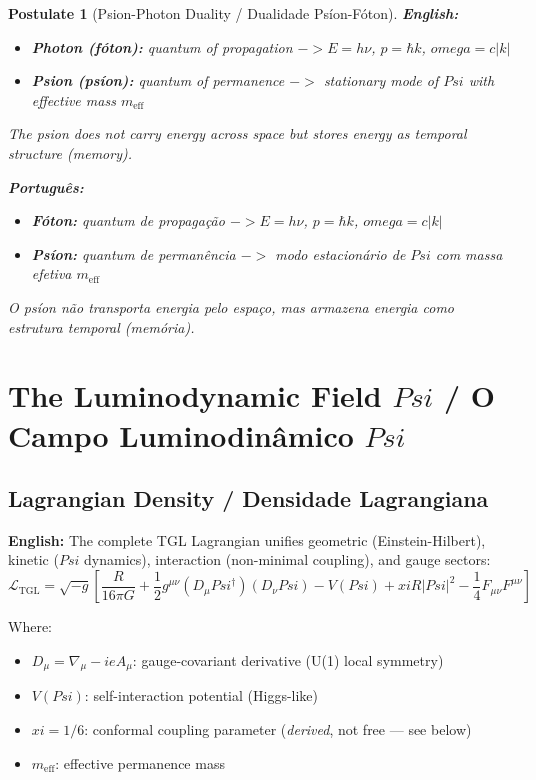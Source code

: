 \documentclass[12pt,a4paper]{article}
\newtheorem{postulate}{Postulate}
\def\Psi{Psi}%
\def\to{ -> }%
\def\xi{xi}%
\def\omega{omega}%
\begin{document}
\begin{postulate}[Psion-Photon Duality / Dualidade Psíon-Fóton]
\textbf{English:}
\begin{itemize}
    \item \textbf{Photon (fóton):} quantum of propagation $\to E = h\nu$, $p = \hbar k$, $\omega = c|k|$
    \item \textbf{Psion (psíon):} quantum of permanence $\to$ stationary mode of $\Psi$ with effective mass $m_{\text{eff}}$
\end{itemize}
The psion does not carry energy across space but stores energy as temporal structure (memory).

\textbf{Português:}
\begin{itemize}
    \item \textbf{Fóton:} quantum de propagação $\to E = h\nu$, $p = \hbar k$, $\omega = c|k|$
    \item \textbf{Psíon:} quantum de permanência $\to$ modo estacionário de $\Psi$ com massa efetiva $m_{\text{eff}}$
\end{itemize}
O psíon não transporta energia pelo espaço, mas armazena energia como estrutura temporal (memória).
\end{postulate}


\section{The Luminodynamic Field $\Psi$ / O Campo Luminodinâmico $\Psi$}

\subsection{Lagrangian Density / Densidade Lagrangiana}

\textbf{English:} The complete TGL Lagrangian unifies geometric (Einstein-Hilbert), kinetic ($\Psi$ dynamics), interaction (non-minimal coupling), and gauge sectors:
\begin{equation}
\boxed{
\mathcal{L}_{\text{TGL}} = \sqrt{-g}\left[\frac{R}{16\pi G} + \frac{1}{2}g^{\mu\nu}(D_\mu\Psi^\dagger)(D_\nu\Psi) - V(\Psi) + \xi R|\Psi|^2 - \frac{1}{4}F_{\mu\nu}F^{\mu\nu}\right]
}
\end{equation}

Where:
\begin{itemize}
    \item $D_\mu = \nabla_\mu - ieA_\mu$: gauge-covariant derivative (U(1) local symmetry)
    \item $V(\Psi)$: self-interaction potential (Higgs-like)
    \item $\xi = 1/6$: conformal coupling parameter (\emph{derived}, not free --- see below)
    \item $m_{\text{eff}}$: effective permanence mass
\end{itemize}
\end{document}
